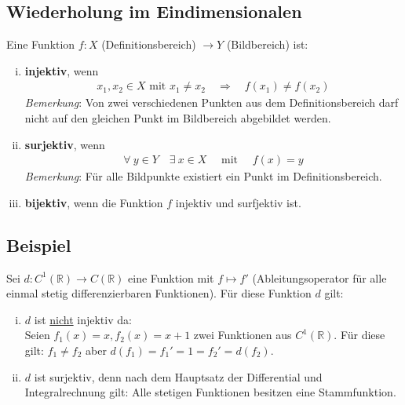 \documentclass[11pt,a4paper]{book}
\newcommand {\R}	{\mathbb{R}}
\newcommand{\1}    	{\mathbbm{1}}
\newcommand{\mitt}	{\textrm{ mit }}
\begin{document}
\subsection*{Wiederholung im Eindimensionalen}
Eine Funktion \(f : X\) (Definitionsbereich) \( \rightarrow Y \) (Bildbereich) ist:
\begin{enumerate}[(i)]
	\item \textbf{injektiv}, wenn
	\begin{align*}
		x_1, x_2 \in X \mitt x_1 \neq x_2 \quad\Rightarrow\quad f(x_1) \neq f(x_2)
	\end{align*}
	\textit{Bemerkung}: Von zwei verschiedenen Punkten aus dem Definitionsbereich darf nicht auf den gleichen Punkt im Bildbereich abgebildet werden.
	\item \textbf{surjektiv}, wenn
	\begin{align*}
		\forall~ y \in Y \quad \exists~ x \in X \quad\mitt\quad f(x) = y
	\end{align*}
	\textit{Bemerkung}: Für alle Bildpunkte existiert ein Punkt im Definitionsbereich.
	\item \textbf{bijektiv}, wenn die Funktion \(f\) injektiv und surfjektiv ist.
\end{enumerate}

\subsection*{Beispiel}
Sei \(d : C^1(\R) \rightarrow C(\R)\) eine Funktion mit \(f \mapsto f'\) (Ableitungsoperator für alle einmal stetig differenzierbaren Funktionen). Für diese Funktion \(d\) gilt:
\begin{enumerate}[(i)]
	\item \(d\) ist \underline{nicht} injektiv da:\\
	Seien \(f_1(x) = x, f_2(x) = x + 1\) zwei Funktionen aus \(C^1(\R)\). Für diese gilt: \(f_1 \neq f_2\) aber \(d(f_1) = f_1' = 1 = f_2' = d(f_2)\).
	\item \(d\) ist surjektiv, denn nach dem Hauptsatz der Differential und Integralrechnung gilt: Alle stetigen Funktionen besitzen eine Stammfunktion.
\end{enumerate}
\end{document}
